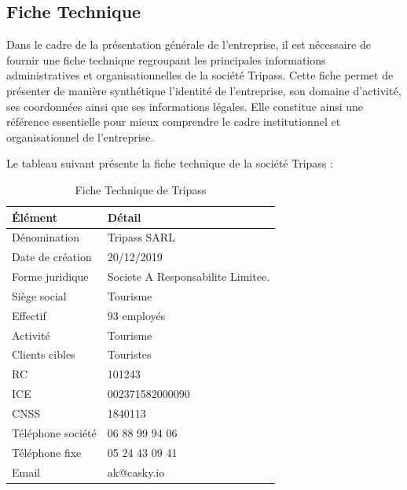 \documentclass[12pt,a4paper]{report}
\numberwithin{figure}{chapter}
\numberwithin{table}{chapter}
\begin{document}
\subsection{Fiche Technique}

Dans le cadre de la présentation générale de l'entreprise, il est nécessaire de fournir une fiche technique regroupant les principales informations administratives et organisationnelles de la société Tripass. Cette fiche permet de présenter de manière synthétique l'identité de l'entreprise, son domaine d'activité, ses coordonnées ainsi que ses informations légales. Elle constitue ainsi une référence essentielle pour mieux comprendre le cadre institutionnel et organisationnel de l'entreprise.


\vspace{0.3cm}

Le tableau suivant présente la fiche technique de la société Tripass :

\vspace{0.5cm}

\begin{table}[H]
\centering
\caption{Fiche Technique de Tripass}

\renewcommand{\arraystretch}{1.6}
\begin{tabular}{|p{}|p{}|}
\hline
\textbf{Élément} & \textbf{Détail} \\
\hline
Dénomination & Tripass SARL \\
\hline
Date de création & 20/12/2019 \\
\hline
Forme juridique & Societe A Responsabilite Limitee. \\
\hline
Siège social & Tourisme \\
\hline
Effectif & 93 employés \\
\hline
Activité & Tourisme \\
\hline
Clients cibles & Touristes \\
\hline
RC & 101243 \\
\hline
ICE & 002371582000090 \\
\hline
CNSS & 1840113 \\
\hline
Téléphone société & 06 88 99 94 06 \\
\hline
Téléphone fixe & 05 24 43 09 41 \\
\hline
Email & ak@casky.io \\
\hline
\end{tabular}

\renewcommand{\arraystretch}{1.0}
\end{table}
\end{document}
